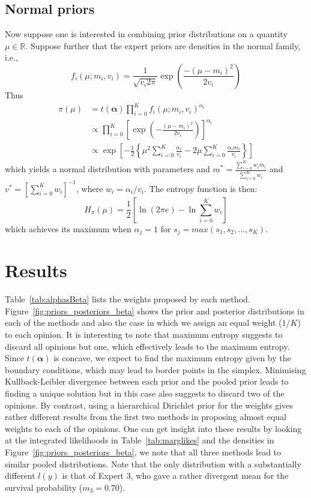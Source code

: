 \documentclass[a4paper, notitlepage, 11pt]{article}
\begin{document}
\subsection*{Normal priors} %
\label{sec:normal}
Now suppose one is interested in combining prior distributions on a quantity $\mu \in \mathbb{R}$.
Suppose further that the expert priors are densities in the normal family, i.e.,
$$ f_i(\mu; m_i, v_i) = \frac{1}{\sqrt{v_i2\pi}} \exp\left(\frac{-(\mu-m_i)^2}{2v_i}\right) $$
Thus 
\begin{align}
\pi(\mu)&= t(\boldsymbol\alpha)\prod_{i=0}^{K}f_i(\mu; m_i, v_i)^{\alpha_i}\\
 &\propto \prod_{i=0}^{K} \left[ \exp \left(-\frac{(\mu-m_i)^2}{2v_i} \right) \right]^{\alpha_i} \\
&\propto \exp\left[-\frac{1}{2}\left\{\mu^2 \sum_{i=0}^K\frac{\alpha_i}{v_i} - 2 \mu \sum_{i=0}^K \frac{\alpha_i m_i}{v_i} \right\} \right] %
\end{align}
which yields a normal distribution with parameters and $m^* = \frac{\sum_{i=0}^K w_i m_i}{\sum_{i=0}^K w_i}$ and $v^* = [\sum_{i=0}^K w_i]^{-1}$,  where $w_i = \alpha_i/v_i$.
The entropy function is then:
\begin{equation}
 \label{eq:normalpoolentropy}
 H_{\pi}(\mu) = \frac{1}{2}\left[ \ln(2\pi e) - \ln\sum_{i=0}^K w_i\right]
\end{equation}
which achieves its maximum when $\alpha_j = 1$ for $s_j = max(s_1, s_2, \ldots, s_K)$.


\section*{Results} %

Table~\ref{tab:alphasBeta} lists the weights proposed by each method.
Figure~\ref{fig:priors_posteriors_beta} shows the prior and posterior distributions in each of the methods and also the case in which we assign an equal weight ($1/K$) to each opinion.
It is interesting to note that maximum entropy suggests to discard all opinions but one, which effectively leads to the maximum entropy.
Since $t(\boldsymbol\alpha)$ is concave, we expect to find the maximum entropy given by the boundary conditions, which may lead to border points in the simplex.
Minimising Kullback-Leibler divergence between each prior and the pooled prior leads to finding a unique solution but in this case also suggests to discard two of the opinions.
By contrast, using a hierarchical Dirichlet prior for the weights gives rather different results from the first two methods in proposing almost equal weights to each of the opinions.
One can get insight into these results by looking at the integrated likelihoods in Table~\ref{tab:marglikes} and the densities in Figure~\ref{fig:priors_posteriors_beta}, we note that all three methods lead  to similar pooled distributions.
Note that the only distribution with a substantially different $l(y)$ is that of Expert 3, who gave a rather divergent mean for the survival probability ($m_3=0.70$).
\end{document}
